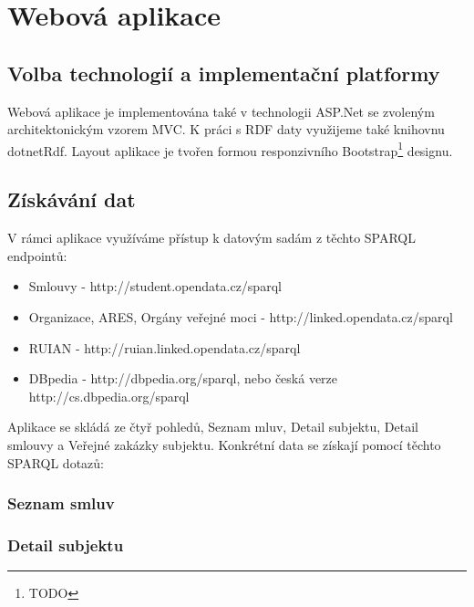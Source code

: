 \section{Webová aplikace}

\subsection{Volba technologií a implementační platformy}

Webová aplikace je implementována také v technologii ASP.Net se zvoleným architektonickým vzorem MVC. K práci s RDF daty využijeme také knihovnu dotnetRdf. Layout aplikace je tvořen formou responzivního Bootstrap\footnote{TODO} designu.

\subsection{Získávání dat}

V rámci aplikace využíváme přístup k datovým sadám z těchto SPARQL endpointů:

\begin{itemize}
\item Smlouvy - http://student.opendata.cz/sparql
\item Organizace, ARES, Orgány veřejné moci - http://linked.opendata.cz/sparql
\item RUIAN - http://ruian.linked.opendata.cz/sparql
\item DBpedia - http://dbpedia.org/sparql, nebo česká verze http://cs.dbpedia.org/sparql
\end{itemize}

Aplikace se skládá ze čtyř pohledů, Seznam mluv, Detail subjektu, Detail smlouvy a Veřejné zakázky subjektu. Konkrétní data se získají pomocí těchto SPARQL dotazů:

\subsubsection*{Seznam smluv}



\subsubsection*{Detail subjektu}



